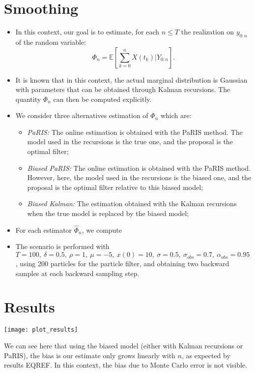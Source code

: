 \documentclass[
]{article}
\providecommand{\tightlist}{%
  \setlength{\itemsep}{0pt}\setlength{\parskip}{0pt}}
\begin{document}
\hypertarget{smoothing}{%
\section{Smoothing}\label{smoothing}}

\begin{itemize}
\item
  In this context, our goal is to estimate, for each \(n\leq T\) the
  realization on \(y_{0:n}\) of the random variable:
  \[\Phi_n = \mathbb{E}\left[\sum_{k = 0}^{n} X(t_k)\vert Y_{0:n}\right].\]
\item
  It is known that in this context, the actual marginal distribution is
  Gaussian with parameters that can be obtained through Kalman
  recursions. The quantity \(\Phi_n\) can then be computed explicitly.
\item
  We consider three alternatives estimation of \(\Phi_n\) which are:

  \begin{itemize}
  \tightlist
  \item
    \emph{PaRIS:} The online estimation is obtained with the PaRIS
    method. The model used in the recursions is the true one, and the
    proposal is the optimal filter;
  \item
    \emph{Biased PaRIS:} The online estimation is obtained with the
    PaRIS method. However, here, the model used in the recursions is the
    biased one, and the proposal is the optimal filter relative to this
    biased model;
  \item
    \emph{Biased Kalman:} The estimation obtained with the Kalman
    recursions when the true model is replaced by the biased model;
  \end{itemize}
\item
  For each estimator \(\hat{\Phi}_n\), we compute
\item
  The scenario is performed with
  \(T = 100,~\delta = 0.5,~\rho = 1,~\mu = -5,~x(0) = 10,~\sigma = 0.5,~\sigma_{obs} = 0.7,~\alpha_{obs} = 0.95\),
  using 200 particles for the particle filter, and obtaining two
  backward samples at each backward sampling step.
\end{itemize}

\hypertarget{results}{%
\section{Results}\label{results}}

\begin{center}\texttt{[image: plot\_results]} \end{center}

We can see here that using the biased model (either with Kalman
recursions or PaRIS), the bias is our estimate only grows linearly with
\(n\), as expected by results EQREF. In this context, the bias due to
Monte Carlo error is not visible.
\end{document}
